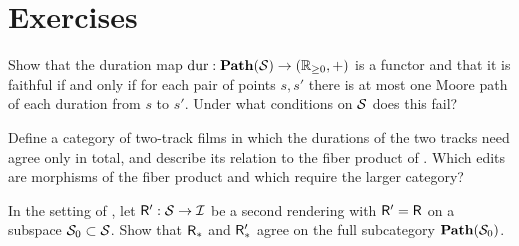 \section*{Exercises}

\begin{exercise}
Show that the duration map $\operatorname{dur}:\mathbf{Path}(\mathcal{S})\to(\mathbb{R}_{\ge0},+)$ is a functor and that it is faithful if and only if for each pair of points $s,s'$ there is at most one Moore path of each duration from $s$ to $s'$. Under what conditions on $\mathcal{S}$ does this fail?
\end{exercise}

\begin{exercise}\label{ex:lcut}
Define a category of two-track films in which the durations of the two tracks need agree only in total, and describe its relation to the fiber product of . Which edits are morphisms of the fiber product and which require the larger category?
\end{exercise}

\begin{exercise}
In the setting of , let $\mathsf{R}':\mathcal{S}\to\mathcal{I}$ be a second rendering with $\mathsf{R}'=\mathsf{R}$ on a subspace $\mathcal{S}_0\subset\mathcal{S}$. Show that $\mathsf{R}_*$ and $\mathsf{R}'_*$ agree on the full subcategory $\mathbf{Path}(\mathcal{S}_0)$.
\end{exercise}
